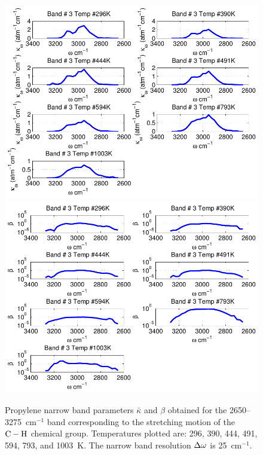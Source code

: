 \begin{figure}[p]
\begin{center}
\includegraphics[width=5.0in]{Figures/Propylene_Kappa_Band3_MALKMUS.pdf}
\includegraphics[width=5.0in]{Figures/Propylene_Beta_Band3_MALKMUS.pdf}
\end{center}
\caption{Propylene narrow band parameters $\bar{\kappa}$ and $\beta$ obtained for the 2650--3275~cm$^{-1}$ band corresponding to the stretching motion of the $\rm C-H$ chemical group. Temperatures plotted are: 296, 390, 444, 491, 594, 793, and 1003~K. The narrow band resolution $\Delta \omega$ is 25~cm$^{-1}$.\label{fig:propylene_kappa_beta3}}
\end{figure}

\FloatBarrier

